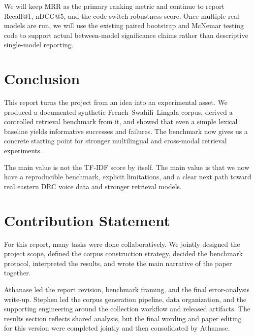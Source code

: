 \documentclass[11pt,twocolumn]{article}
\begin{document}
We will keep MRR as the primary ranking metric and continue to report Recall@1, nDCG@5, and the code-switch robustness score. Once multiple real models are run, we will use the existing paired bootstrap and McNemar testing code to support actual between-model significance claims rather than descriptive single-model reporting.

\section{Conclusion}
This report turns the project from an idea into an experimental asset. We produced a documented synthetic French--Swahili--Lingala corpus, derived a controlled retrieval benchmark from it, and showed that even a simple lexical baseline yields informative successes and failures. The benchmark now gives us a concrete starting point for stronger multilingual and cross-modal retrieval experiments.

The main value is not the TF-IDF score by itself. The main value is that we now have a reproducible benchmark, explicit limitations, and a clear next path toward real eastern DRC voice data and stronger retrieval models.




\appendix
\section{Contribution Statement}
For this report, many tasks were done collaboratively. We jointly designed the project scope, defined the corpus construction strategy, decided the benchmark protocol, interpreted the results, and wrote the main narrative of the paper together.

Athanase led the report revision, benchmark framing, and the final error-analysis write-up. Stephen led the corpus generation pipeline, data organization, and the supporting engineering around the collection workflow and released artifacts. The results section reflects shared analysis, but the final wording and paper editing for this version were completed jointly and then consolidated by Athanase.
\end{document}
